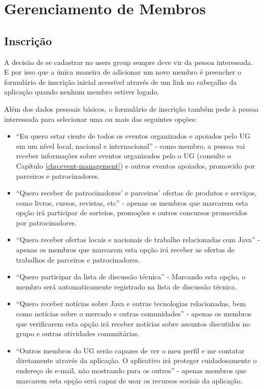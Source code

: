 \documentclass[envcountsame,envcountchap]{svmono}
\begin{document}
\chapter{Gerenciamento de Membros}

\section{Inscrição}

A decisão de se cadastrar no users group sempre deve vir da pessoa interessada. E por isso que a única maneira de adicionar um novo membro é preencher o formulário de inscrição inicial acessível através de um link no cabeçalho da aplicação quando nenhum membro estiver logado.

Além dos dados pessoais básicos, o formulário de inscrição também pede à pessoa interessada para selecionar uma ou mais das seguintes opções:

\begin{itemize}
\item ``Eu quero estar ciente de todos os eventos organizados e apoiados pelo UG em um nível local, nacional e internacional'' - como membro, a pessoa vai receber informações sobre eventos organizados pelo o UG (consulte o Capítulo \ref{chp:event-management}) e outros eventos apoiados, promovido por parceiros e patrocinadores.

\item ``Quero receber de patrocinadores' e parceiros' ofertas de produtos e serviços, como livros, cursos, revistas, etc'' - apenas os membros que marcarem esta opção irá participar de sorteios, promoções e outros concursos promovidos por patrocinadores.

\item ``Quero receber ofertas locais e nacionais de trabalho relacionadas com Java'' - apenas os membros que marcarem esta opção irá receber as ofertas de trabalhos de parceiros e patrocinadores.

\item ``Quero participar da lista de discussão técnica'' - Marcando esta opção, o membro será automaticamente registrado na lista de discussão técnica.

\item ``Quero receber notícias sobre Java e outras tecnologias relacionadas, bem como notícias sobre o mercado e outras comunidades'' - apenas os membros que verificarem esta opção irá receber notícias sobre assuntos discutidos no grupo e outras atividades comunitárias.

\item ``Outros membros do UG serão capazes de ver o meu perfil e me contatar diretamente através da aplicação. O aplicativo irá proteger cuidadosamente o endereço de e-mail, não mostrando para os outros'' - apenas membros que marcarem esta opção será capaz de usar os recursos sociais da aplicação.
\end{itemize}
\end{document}
